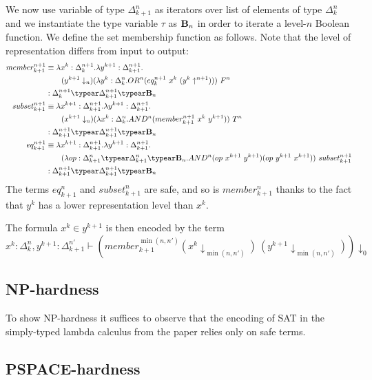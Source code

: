 We now use variable of type $\Delta_{k+1}^n$ as iterators over list of elements of type $\Delta_k^n$ and we instantiate the type variable $\tau$ as $\mathbf{B}_n$ in order to iterate a level-$n$ Boolean function. We define the set membership function as follows. Note that
the level of representation differs from input to output: \begin{align*}
  member_{k+1}^{n+1} &\equiv \lambda x^k : \Delta_k^{n+1}.\lambda y^{k+1}:\Delta_{k+1}^{n+1}. \\
& \qquad (y^{k+1}\downarrow_n) (\lambda y^k : \Delta_k^n . OR^n (eq_k^{n+1}~x^k~(y^k\uparrow^{n+1})))~F^n \\
  & : \Delta_k^{n+1} \typear \Delta_{k+1}^{n+1} \typear \booltype_n
\\
  subset_{k+1}^{n+1} &\equiv \lambda x^{k+1} : \Delta_{k+1}^{n+1}.\lambda y^{k+1}:\Delta_{k+1}^{n+1}. \\
  & \qquad (x^{k+1}\downarrow_n) (\lambda x^k : \Delta_k^n . AND^n (member_{k+1}^{n+1}~x^k~y^{k+1}))~T^n \\
  & : \Delta_{k+1}^{n+1} \typear \Delta_{k+1}^{n+1} \typear\booltype_n
\\
  eq_{k+1}^{n+1} &\equiv \lambda x^{k+1} : \Delta_{k+1}^{n+1}.\lambda y^{k+1}:\Delta_{k+1}^{n+1}. \\
   & \qquad
   (\lambda op:\Delta_{k+1}^n\typear\Delta_{k+1}^n\typear\booltype_n. AND^n (op~x^{k+1}~y^{k+1})(op~y^{k+1}~x^{k+1}))~subset_{k+1}^{n+1} \\
  & : \Delta_{k+1}^{n+1} \typear \Delta_{k+1}^{n+1} \typear \booltype_n
\end{align*}
The terms $eq_{k+1}^n$ and $subset_{k+1}^n$ are safe, and so is $member_{k+1}^n$ thanks to the fact that $y^k$ has a lower representation level than $x^k$.

The formula $x^k\in y^{k+1}$ is then encoded by the term
$$x^k:\Delta_k^n, y^{k+1}:\Delta_{k+1}^{n'}\vdash \left(member_{k+1}^{\min(n,n')} (x^k\downarrow_{\min(n,n')})~(y^{k+1}\downarrow_{\min(n,n')})\right)\downarrow_0$$


\subsection{NP-hardness}
To show NP-hardness it suffices to observe that the encoding of SAT in the simply-typed lambda calculus from the paper\cite{asperti-np} relies only on safe terms.

\subsection{PSPACE-hardness}

